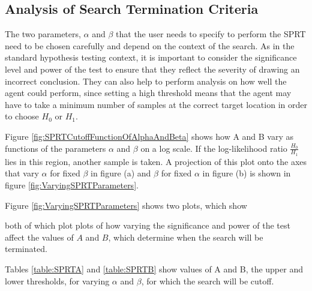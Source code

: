 \subsection{Analysis of Search Termination Criteria}
The two parameters, $\alpha$ and $\beta$ that the user needs to specify to perform the SPRT need to be chosen carefully and depend on the context of the search. As in the standard hypothesis testing context, it is important to consider the significance level and power of the test to ensure that they reflect the severity of drawing an incorrect conclusion. They can also help to perform analysis on how well the agent could perform, since setting a high threshold means that the agent may have to take a minimum number of samples at the correct target location in order to choose $H_0$ or $H_1$. \par

Figure \ref{fig:SPRTCutoffFunctionOfAlphaAndBeta} shows how A and B vary as functions of the parameters $\alpha$ and $\beta$ on a log scale. If the log-likelihood ratio $\frac{H_0}{H_1}$ lies in this region, another sample is taken. A projection of this plot onto the axes that vary $\alpha$ for fixed $\beta$ in figure (a) and $\beta$ for fixed $\alpha$ in figure (b) is shown in figure \ref{fig:VaryingSPRTParameters}.


Figure \ref{fig:VaryingSPRTParameters} shows two plots, which show 

both of which plot  plots of how varying the significance and power of the test affect the values of $A$ and $B$, which determine when the search will be terminated.

Tables \ref{table:SPRTA} and \ref{table:SPRTB} show values of A and B, the upper and lower thresholds, for varying $\alpha$ and $\beta$, for which the search will be cutoff. 
\par

